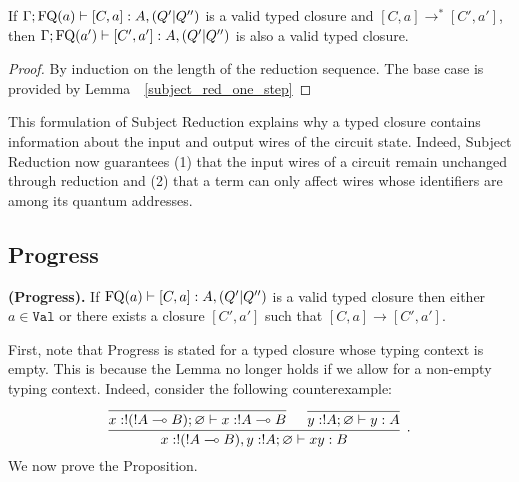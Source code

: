 \documentclass[twoside]{article}
\begin{document}
\begin{corollary}
If $\Gamma;\mathop{\textrm{FQ}}\nolimits(a)\vdash [C,a]:A,(Q'|Q'')$ is a valid typed closure 
and $[C,a]\to^* [C',a']$, then $\Gamma;\mathop{\textrm{FQ}}\nolimits(a')\vdash [C',a']:A,(Q'|Q'')$ 
is also a valid typed closure.
\end{corollary}

\begin{proof}
By induction on the length of the reduction sequence. The base case is 
provided by Lemma~~\hyperref[subject_red_one_step]{\ref*{subject_red_one_step}}
\end{proof}

This formulation of Subject Reduction explains why a typed closure contains 
information about the input and output wires of the circuit state. Indeed, 
Subject Reduction now guarantees (1) that the input wires of a circuit 
remain unchanged through reduction and (2) that a term can only affect 
wires whose identifiers are among its quantum addresses.

\subsection{Progress}

\begin{proposition}
{\bf (Progress).}
If $\mathop{\textrm{FQ}}\nolimits(a)\vdash [C,a]:A,(Q'|Q'')$ is a valid typed closure then either 
$a\in\mathtt{Val}$ or there exists a closure $[C',a']$ such that 
$[C,a]\to [C',a']$.
\end{proposition}

First, note that Progress is stated for a typed closure whose typing 
context is empty. This is because the Lemma no longer holds if we allow 
for a non-empty typing context. Indeed, consider the following counterexample:
\[
\infer[.]{x:!(!A\loli B), y:!A;\varnothing\entails xy:B}{
 \infer[]{x:!(!A\loli B);\varnothing\entails x:!A\loli B}{ 
 }
 &
 \infer[]{y:!A;\varnothing\entails y:A}{ 
 }
}
\]
We now prove the Proposition.
\end{document}
